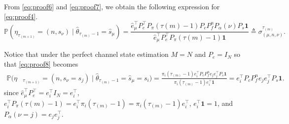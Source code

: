 \documentclass[journal,twoside,web]{ieeecolor}
\begin{document}
\begin{figure*}[ht]
\raggedright
From \eqref{eq:proof6} and \eqref{eq:proof7}, we obtain the following expression for \eqref{eq:proof4}.
\begin{equation}\label{eq:proof8}
    \mathbb{P}(\eta_{\tau_{(m+1)}}^{} = (n,\hat{s}_{\nu}) \mid \hat{\theta}_{\tau_{(m)}-1} = \hat{s}_{\mu}) =
    \frac{\hat{e}_{\mu}^{\top} P_{e}^{\top} P_{\pi}(\tau{(m)}-1) P_{c} P_{f}^{n} P_{\alpha}(\nu) P_{s} \mathbf{1}}{\hat{e}_{\mu}^{\top} P_{e}^{\top} P_{\pi}(\tau{(m)}-1)\mathbf{1}} \triangleq \sigma_{(\mu,n,\nu)}^{\tau_{(m)}}.
\end{equation}
\end{figure*}
\begin{figure*}[ht]
\raggedright
Notice that under the perfect channel state estimation $M=N$ and $P_e = I_{N}$ so that \eqref{eq:proof8} becomes
\begin{align}
\mathbb{P}(\eta&_{\tau_{(m+1)}}^{} = (n,\hat{s}_{\nu}=s_j) \mid \hat{\theta}_{\tau_{(m)}-1} = \hat{s}_{\mu} = s_{i}) =
    \frac{\pi_{i}(\tau_{(m)}-1)e_{i}^{\top} P_{c} P_{f}^{n} e_{j}e_{j}^{\top} P_{s} \mathbf{1}}{\pi_{i}(\tau_{(m)}-1)e_{i}^{\top}\mathbf{1}} = e_{i}^{\top} P_{c} P_{f}^{n} e_{j}e_{j}^{\top} P_{s} \mathbf{1}.
\end{align}
since $\hat{e}_{\mu}^{\top} P_{e}^{\top} = e_{i}^{\top} I_{N} = e_{i}^{\top}$, $e_{i}^{\top} P_{\pi}(\tau{(m)}-1)=e_{i}^{\top}\pi_{i}(\tau_{(m)}-1)=\pi_{i}(\tau_{(m)}-1)e_{i}^{\top}$, $e_{i}^{\top}\mathbf{1}=1$, and $P_{\alpha}(\nu=j)=e_{j}e_{j}^{\top}$.
\end{figure*}
\end{document}
